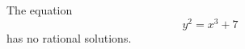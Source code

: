 \begin{proposition}
    The equation
\[
    y^2=x^3+7
\]
    has no rational solutions.
\end{proposition}
